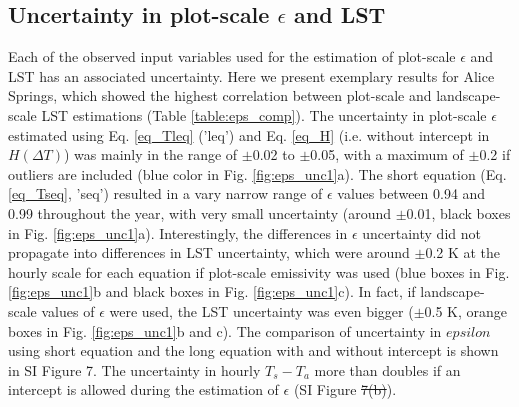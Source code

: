 \documentclass[fleqn,10pt]{wlscirep}
\providecommand{\DIFaddtex}[1]{{\protect\color{blue}\uwave{#1}}} %
\providecommand{\DIFdeltex}[1]{{\protect\color{red}\sout{#1}}}                      %
\providecommand{\DIFaddbegin}{} %
\providecommand{\DIFaddend}{} %
\providecommand{\DIFdelbegin}{} %
\providecommand{\DIFdelend}{} %
\providecommand{\DIFadd}[1]{\texorpdfstring{\DIFaddtex{#1}}{#1}} %
\providecommand{\DIFdel}[1]{\texorpdfstring{\DIFdeltex{#1}}{}} %
\begin{document}
\subsection{Uncertainty in plot-scale $\epsilon$ and LST}
Each of the observed input variables used for the estimation of plot-scale $\epsilon$ and LST has an associated uncertainty. Here we present exemplary results for Alice Springs, which showed the highest correlation between plot-scale and landscape-scale LST estimations (Table \ref{table:eps_comp}).
The uncertainty in plot-scale $\epsilon$ estimated using Eq. \ref{eq_Tleq} ('leq') and Eq. \ref{eq_H} (i.e. without intercept in $H(\Delta  T)$) was mainly in the range of $\pm$0.02 to $\pm$0.05, with a maximum of $\pm$0.2 if outliers are included (blue color in Fig. \ref{fig:eps_unc1}a). The short equation (Eq.\ref{eq_Tseq}, 'seq') resulted in a vary narrow range of $\epsilon$ values between 0.94 and 0.99 throughout the year, with very small uncertainty (around $\pm$0.01, black boxes in Fig. \ref{fig:eps_unc1}a). Interestingly, the differences in $\epsilon$ uncertainty did not propagate into differences in LST uncertainty, which were around $\pm$0.2 K at the hourly scale for each equation if plot-scale emissivity was used (blue boxes in Fig. \ref{fig:eps_unc1}b and black boxes in Fig. \ref{fig:eps_unc1}c). In fact, if landscape-scale values of $\epsilon$ were used, the LST uncertainty was even bigger ($\pm$0.5 K, orange boxes in Fig. \ref{fig:eps_unc1}b and c). The comparison of uncertainty in \DIFdelbegin \DIFdel{$epsilon$ }\DIFdelend \DIFaddbegin \DIFadd{$\epsilon_{plot}$ }\DIFaddend using short equation and the long equation with and without intercept is shown in SI Figure 7. The uncertainty in hourly $T_{s} -T_{a}$ more than doubles if an intercept is allowed during the estimation of $\epsilon$ (SI Figure \DIFdelbegin \DIFdel{7(b)}\DIFdelend \DIFaddbegin \DIFadd{7b}\DIFaddend ).
\end{document}
